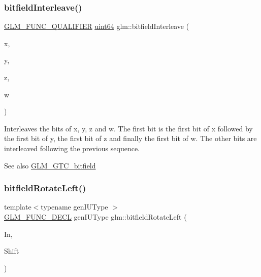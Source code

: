 \subsubsection{\texorpdfstring{bitfield\+Interleave()}{bitfieldInterleave()}\hspace{0.1cm}{\footnotesize\ttfamily [16/16]}}
{\footnotesize\ttfamily \hyperlink{setup_8hpp_a33fdea6f91c5f834105f7415e2a64407}{G\+L\+M\+\_\+\+F\+U\+N\+C\+\_\+\+Q\+U\+A\+L\+I\+F\+I\+ER} \hyperlink{group__gtc__type__precision_gae3632bf9b37da66233d78930dd06378a}{uint64} glm\+::bitfield\+Interleave (\begin{DoxyParamCaption}\item[{\hyperlink{group__gtc__type__precision_gad8c2939e1fdd8e5828b31d95c52255d5}{uint16}}]{x,  }\item[{\hyperlink{group__gtc__type__precision_gad8c2939e1fdd8e5828b31d95c52255d5}{uint16}}]{y,  }\item[{\hyperlink{group__gtc__type__precision_gad8c2939e1fdd8e5828b31d95c52255d5}{uint16}}]{z,  }\item[{\hyperlink{group__gtc__type__precision_gad8c2939e1fdd8e5828b31d95c52255d5}{uint16}}]{w }\end{DoxyParamCaption})}

Interleaves the bits of x, y, z and w. The first bit is the first bit of x followed by the first bit of y, the first bit of z and finally the first bit of w. The other bits are interleaved following the previous sequence.

\begin{DoxySeeAlso}{See also}
\hyperlink{group__gtc__bitfield}{G\+L\+M\+\_\+\+G\+T\+C\+\_\+bitfield} 
\end{DoxySeeAlso}
\mbox{\label{group__gtc__bitfield_ga2eb49678a344ce1495bdb5586d9896b9}} 
\subsubsection{\texorpdfstring{bitfield\+Rotate\+Left()}{bitfieldRotateLeft()}\hspace{0.1cm}{\footnotesize\ttfamily [1/2]}}
{\footnotesize\ttfamily template$<$typename gen\+I\+U\+Type $>$ \\
\hyperlink{setup_8hpp_ab2d052de21a70539923e9bcbf6e83a51}{G\+L\+M\+\_\+\+F\+U\+N\+C\+\_\+\+D\+E\+CL} gen\+I\+U\+Type glm\+::bitfield\+Rotate\+Left (\begin{DoxyParamCaption}\item[{gen\+I\+U\+Type}]{In,  }\item[{int}]{Shift }\end{DoxyParamCaption})}

